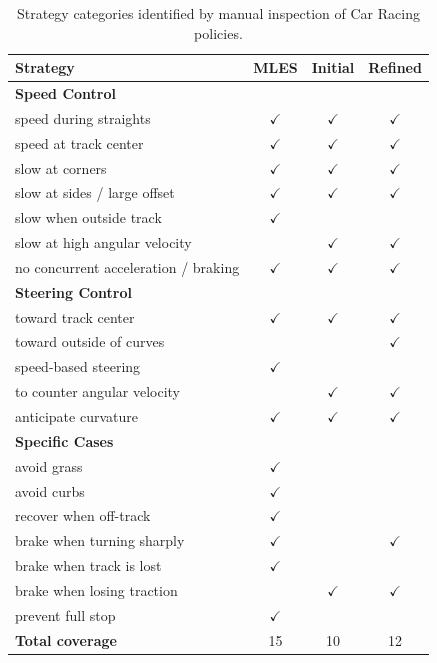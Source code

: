 \begin{table}[!t]
\centering
\footnotesize
\setlength{\tabcolsep}{4pt}
\begin{tabular}{l|c|c|c}
\toprule
\textbf{Strategy} & \textbf{MLES} & \textbf{Initial} & \textbf{Refined}  \\
\midrule
\multicolumn{4}{l}{\textbf{Speed Control}} \\
\midrule
speed during straights & $\checkmark$ & $\checkmark$ & $\checkmark$ \\
speed at track center & $\checkmark$ & $\checkmark$  & $\checkmark$ \\
slow at corners & $\checkmark$ & $\checkmark$ & $\checkmark$ \\
slow at sides / large offset & $\checkmark$ & $\checkmark$ & $\checkmark$ \\
slow when outside track & $\checkmark$ & & \\
slow at high angular velocity & & $\checkmark$ & $\checkmark$ \\
no concurrent acceleration / braking& $\checkmark$ & $\checkmark$ & $\checkmark$ \\
\midrule
\multicolumn{4}{l}{\textbf{Steering Control}} \\
\midrule
toward track center & $\checkmark$ & $\checkmark$ & $\checkmark$ \\
toward outside of curves &  & & $\checkmark$ \\
speed-based steering & $\checkmark$ &  &  \\
to counter angular velocity & & $\checkmark$ & $\checkmark$  \\
anticipate curvature & $\checkmark$ & $\checkmark$ & $\checkmark$ \\
\midrule
\multicolumn{4}{l}{\textbf{Specific Cases}} \\
\midrule
avoid grass & $\checkmark$ &  &  \\
avoid curbs & $\checkmark$ &  &  \\
recover when off-track & $\checkmark$ &  &  \\
brake when turning sharply & $\checkmark$ &  & $\checkmark$ \\
brake when track is lost & $\checkmark$ &  &  \\
brake when losing traction & & $\checkmark$ & $\checkmark$ \\
prevent full stop & $\checkmark$ &  &  \\
\midrule
\textbf{Total coverage} & 15 & 10 & 12 \\
\bottomrule
\end{tabular}
\caption{Strategy categories identified by manual inspection of Car Racing policies.}
\label{tab:semantic}
\end{table}